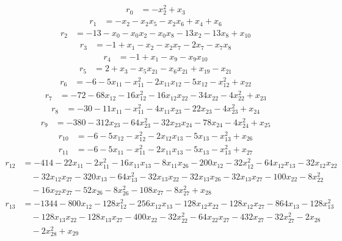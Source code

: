 \begin{align*}
r_{0}&=
-x_{2}^{2}+x_{3}
\end{align*}
\begin{align*}
r_{1}&=
-x_{2}-x_{2}x_{5}-x_{2}x_{6}+x_{4}+x_{6}
\end{align*}
\begin{align*}
r_{2}&=
-13-x_{0}-x_{0}x_{2}-x_{0}x_{8}-13x_{2}-13x_{8}+x_{10}
\end{align*}
\begin{align*}
r_{3}&=
-1+x_{1}-x_{2}-x_{2}x_{7}-2x_{7}-x_{7}x_{8}
\end{align*}
\begin{align*}
r_{4}&=
-1+x_{1}-x_{9}-x_{9}x_{10}
\end{align*}
\begin{align*}
r_{5}&=
2+x_{3}-x_{5}x_{21}-x_{6}x_{21}+x_{19}-x_{21}
\end{align*}
\begin{align*}
r_{6}&=
-6-5x_{11}-x_{11}^{2}-2x_{11}x_{12}-5x_{12}-x_{12}^{2}+x_{22}
\end{align*}
\begin{align*}
r_{7}&=
-72-68x_{12}-16x_{12}^{2}-16x_{12}x_{22}-34x_{22}-4x_{22}^{2}+x_{23}
\end{align*}
\begin{align*}
r_{8}&=
-30-11x_{11}-x_{11}^{2}-4x_{11}x_{23}-22x_{23}-4x_{23}^{2}+x_{24}
\end{align*}
\begin{align*}
r_{9}&=
-380-312x_{23}-64x_{23}^{2}-32x_{23}x_{24}-78x_{24}-4x_{24}^{2}+x_{25}
\end{align*}
\begin{align*}
r_{10}&=
-6-5x_{12}-x_{12}^{2}-2x_{12}x_{13}-5x_{13}-x_{13}^{2}+x_{26}
\end{align*}
\begin{align*}
r_{11}&=
-6-5x_{11}-x_{11}^{2}-2x_{11}x_{13}-5x_{13}-x_{13}^{2}+x_{27}
\end{align*}
\begin{align*}
r_{12}&=
-414-22x_{11}-2x_{11}^{2}-16x_{11}x_{13}-8x_{11}x_{26}-200x_{12}-32x_{12}^{2}-64x_{12}x_{13}-32x_{12}x_{22} \\
&\quad -32x_{12}x_{27}-320x_{13}-64x_{13}^{2}-32x_{13}x_{22}-32x_{13}x_{26}-32x_{13}x_{27}-100x_{22}-8x_{22}^{2} \\
&\quad -16x_{22}x_{27}-52x_{26}-8x_{26}^{2}-108x_{27}-8x_{27}^{2}+x_{28}
\end{align*}
\begin{align*}
r_{13}&=
-1344-800x_{12}-128x_{12}^{2}-256x_{12}x_{13}-128x_{12}x_{22}-128x_{12}x_{27}-864x_{13}-128x_{13}^{2} \\
&\quad -128x_{13}x_{22}-128x_{13}x_{27}-400x_{22}-32x_{22}^{2}-64x_{22}x_{27}-432x_{27}-32x_{27}^{2}-2x_{28} \\
&\quad -2x_{28}^{2}+x_{29}
\end{align*}
